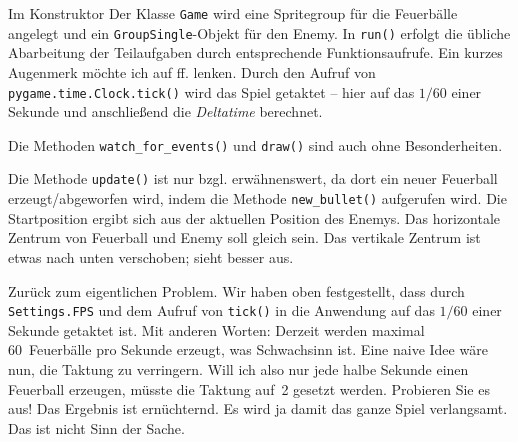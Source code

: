 
Im Konstruktor Der Klasse \texttt{Game} wird eine Spritegroup für die Feuerbälle angelegt und ein \texttt{GroupSingle}-Objekt für den Enemy. In \texttt{run()} erfolgt die übliche Abarbeitung der Teilaufgaben durch entsprechende Funktionsaufrufe. Ein kurzes Augenmerk möchte ich auf ff. lenken. Durch den Aufruf von \texttt{pygame.time.Clock.tick()} wird das Spiel getaktet -- hier auf das $1/60$ einer Sekunde und anschließend die \emph{Deltatime} berechnet. 


Die Methoden \texttt{watch\_for\_events()} und \texttt{draw()} sind auch ohne Besonderheiten.


Die Methode \texttt{update()} ist nur bzgl.  erwähnenswert, da dort ein neuer Feuerball erzeugt/abgeworfen wird, indem die Methode \texttt{new\_bullet()} aufgerufen wird. Die Startposition ergibt sich aus der aktuellen Position des Enemys. Das horizontale Zentrum von Feuerball und Enemy soll gleich sein. Das vertikale Zentrum ist etwas nach unten verschoben; sieht besser aus. 



Zurück zum eigentlichen Problem. Wir haben oben festgestellt, dass durch \texttt{Settings.FPS} und dem Aufruf von \texttt{tick()} in  die Anwendung auf das $1/60$ einer Sekunde getaktet ist. Mit anderen Worten: Derzeit werden maximal 60~Feuerbälle pro Sekunde erzeugt, was Schwachsinn ist. Eine naive Idee wäre nun, die Taktung zu verringern. Will ich also nur jede halbe Sekunde einen Feuerball erzeugen, müsste die Taktung auf~2 gesetzt werden. Probieren Sie es aus! Das Ergebnis ist ernüchternd. Es wird ja damit das ganze Spiel verlangsamt. Das ist nicht Sinn der Sache.

